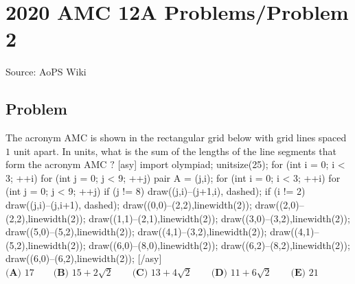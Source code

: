 \documentclass[12pt]{article}
\begin{document}
\section*{{2020 AMC 12A Problems/Problem 2}}
Source: AoPS Wiki

\subsection*{Problem}
The acronym AMC is shown in the rectangular grid below with grid lines spaced $1$ unit apart. In units, what is the sum of the lengths of the line segments that form the acronym AMC $?$ [asy] import olympiad; unitsize(25); for (int i = 0; i < 3; ++i) { for (int j = 0; j < 9; ++j) { pair A = (j,i); } } for (int i = 0; i < 3; ++i) { for (int j = 0; j < 9; ++j) { if (j != 8) { draw((j,i)--(j+1,i), dashed); } if (i != 2) { draw((j,i)--(j,i+1), dashed); } } } draw((0,0)--(2,2),linewidth(2)); draw((2,0)--(2,2),linewidth(2)); draw((1,1)--(2,1),linewidth(2)); draw((3,0)--(3,2),linewidth(2)); draw((5,0)--(5,2),linewidth(2)); draw((4,1)--(3,2),linewidth(2)); draw((4,1)--(5,2),linewidth(2)); draw((6,0)--(8,0),linewidth(2)); draw((6,2)--(8,2),linewidth(2)); draw((6,0)--(6,2),linewidth(2)); [/asy] $\textbf{(A) } 17 \qquad \textbf{(B) } 15 + 2\sqrt{2} \qquad \textbf{(C) } 13 + 4\sqrt{2} \qquad \textbf{(D) } 11 + 6\sqrt{2} \qquad \textbf{(E) } 21$
\end{document}
